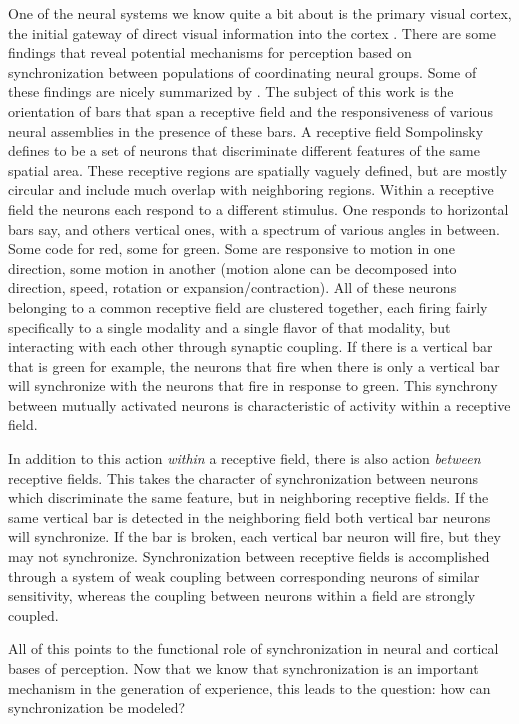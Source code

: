 \documentclass[12pt]{article}
\begin{document}
One of the neural systems we know quite a bit about is the primary visual cortex, the initial gateway of direct visual information into the cortex \cite{Tanaka}.  There are some findings that reveal potential mechanisms for perception based on synchronization between populations of coordinating neural groups.  Some of these findings are nicely summarized by \cite{Sompolinsky}.  The subject of this work is the orientation of bars that span a receptive field and the responsiveness of various neural assemblies in the presence of these bars.  A receptive field Sompolinsky defines to be a set of neurons that discriminate different features of the same spatial area.  These receptive regions are spatially vaguely defined, but are mostly circular and include much overlap with neighboring regions.  Within a receptive field the neurons each respond to a different stimulus.  One responds to horizontal bars say, and others vertical ones, with a spectrum of various angles in between.  Some code for red, some for green.  Some are responsive to motion in one direction, some motion in another (motion alone can be decomposed into direction, speed, rotation or expansion/contraction).  All of these neurons belonging to a common receptive field are clustered together, each firing fairly specifically to a single modality and a single flavor of that modality, but interacting with each other through synaptic coupling.  If there is a vertical bar that is green for example, the neurons that fire when there is only a vertical bar will synchronize with the neurons that fire in response to green.  This synchrony between mutually activated neurons is characteristic of activity within a receptive field.  

In addition to this action {\em within} a receptive field, there is also action {\em between} receptive fields.  This takes the character of synchronization between neurons which discriminate the same feature, but in neighboring receptive fields.  If the same vertical bar is detected in the neighboring field both vertical bar neurons will synchronize.  If the bar is broken, each vertical bar neuron will fire, but they may not synchronize.  Synchronization between receptive fields is accomplished through a system of weak coupling between corresponding neurons of similar sensitivity, whereas the coupling between neurons within a field are strongly coupled.  

All of this points to the functional role of synchronization in neural and cortical bases of perception.  Now that we know that synchronization is an important mechanism in the generation of experience, this leads to the question: how can synchronization be modeled?
\end{document}
